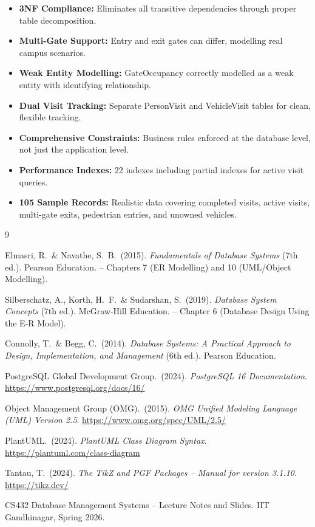 \documentclass[a4paper, 12pt]{article}
\begin{document}
\begin{itemize}[leftmargin=*, nosep]
    \item \textbf{3NF Compliance:} Eliminates all transitive dependencies through proper table decomposition.
    \item \textbf{Multi-Gate Support:} Entry and exit gates can differ, modelling real campus scenarios.
    \item \textbf{Weak Entity Modelling:} GateOccupancy correctly modelled as a weak entity with identifying relationship.
    \item \textbf{Dual Visit Tracking:} Separate PersonVisit and VehicleVisit tables for clean, flexible tracking.
    \item \textbf{Comprehensive Constraints:} Business rules enforced at the database level, not just the application level.
    \item \textbf{Performance Indexes:} 22 indexes including partial indexes for active visit queries.
    \item \textbf{105 Sample Records:} Realistic data covering completed visits, active visits, multi-gate exits, pedestrian entries, and unowned vehicles.
\end{itemize}

\newpage
\begin{thebibliography}{9}

Elmasri, R.\ \& Navathe, S.\ B.\ (2015).
\textit{Fundamentals of Database Systems} (7th ed.).
Pearson Education.
-- Chapters 7 (ER Modelling) and 10 (UML/Object Modelling).

Silberschatz, A., Korth, H.\ F.\ \& Sudarshan, S.\ (2019).
\textit{Database System Concepts} (7th ed.).
McGraw-Hill Education.
-- Chapter 6 (Database Design Using the E-R Model).

Connolly, T.\ \& Begg, C.\ (2014).
\textit{Database Systems: A Practical Approach to Design, Implementation, and Management} (6th ed.).
Pearson Education.

PostgreSQL Global Development Group.\ (2024).
\textit{PostgreSQL 16 Documentation}.
\url{https://www.postgresql.org/docs/16/}

Object Management Group (OMG).\ (2015).
\textit{OMG Unified Modeling Language (UML) Version 2.5}.
\url{https://www.omg.org/spec/UML/2.5/}

PlantUML.\ (2024).
\textit{PlantUML Class Diagram Syntax}.
\url{https://plantuml.com/class-diagram}

Tantau, T.\ (2024).
\textit{The TikZ and PGF Packages -- Manual for version 3.1.10}.
\url{https://tikz.dev/}

CS432 Database Management Systems -- Lecture Notes and Slides.
IIT Gandhinagar, Spring 2026.

\end{thebibliography}
\end{document}
